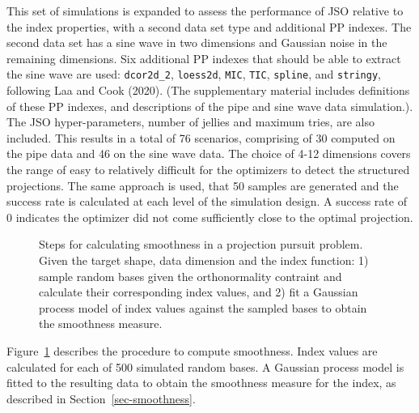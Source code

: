 \documentclass[
  12pt,
]{interact}
\theoremstyle{plain}
\begin{document}
This set of simulations is expanded to assess the performance of JSO
relative to the index properties, with a second data set type and
additional PP indexes. The second data set has a sine wave in two
dimensions and Gaussian noise in the remaining dimensions. Six
additional PP indexes that should be able to extract the sine wave are
used: \texttt{dcor2d\_2}, \texttt{loess2d}, \texttt{MIC}, \texttt{TIC},
\texttt{spline}, and \texttt{stringy}, following Laa and Cook (2020).
(The supplementary material includes definitions of these PP indexes,
and descriptions of the pipe and sine wave data simulation.). The JSO
hyper-parameters, number of jellies and maximum tries, are also
included. This results in a total of 76 scenarios, comprising of 30
computed on the pipe data and 46 on the sine wave data. The choice of
4-12 dimensions covers the range of easy to relatively difficult for the
optimizers to detect the structured projections. The same approach is
used, that 50 samples are generated and the success rate is calculated
at each level of the simulation design. A success rate of 0 indicates
the optimizer did not come sufficiently close to the optimal projection.

\begin{figure}


\caption{\label{fig-smoothness}Steps for calculating smoothness in a
projection pursuit problem. Given the target shape, data dimension and
the index function: 1) sample random bases given the orthonormality
contraint and calculate their corresponding index values, and 2) fit a
Gaussian process model of index values against the sampled bases to
obtain the smoothness measure.}

\end{figure}%

Figure~\ref{fig-smoothness} describes the procedure to compute
smoothness. Index values are calculated for each of 500 simulated random
bases. A Gaussian process model is fitted to the resulting data to
obtain the smoothness measure for the index, as described in
Section~\ref{sec-smoothness}.
\end{document}

